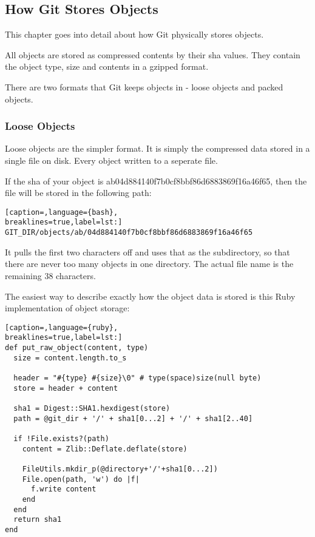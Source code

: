 \subsection{How Git Stores Objects}
This chapter goes into detail about how Git physically stores objects.

All objects are stored as compressed contents by their sha values. They contain
the object type, size and contents in a gzipped format.

There are two formats that Git keeps objects in - loose objects and packed
objects.

\subsubsection{Loose Objects}
Loose objects are the simpler format. It is simply the compressed data stored
in a single file on disk. Every object written to a seperate file.

If the sha of your object is ab04d884140f7b0cf8bbf86d6883869f16a46f65, then the
file will be stored in the following path:
\lstset{basicstyle=\scriptsize, numbers=none, captionpos=b, tabsize=4}
\begin{lstlisting}[caption=,language={bash},
breaklines=true,label=lst:]
GIT_DIR/objects/ab/04d884140f7b0cf8bbf86d6883869f16a46f65
\end{lstlisting}

It pulls the first two characters off and uses that as the subdirectory, so
that there are never too many objects in one directory. The actual file name is
the remaining 38 characters.

The easiest way to describe exactly how the object data is stored is this Ruby
implementation of object storage:
\lstset{basicstyle=\scriptsize, numbers=none, captionpos=b, tabsize=4}
\begin{lstlisting}[caption=,language={ruby},
breaklines=true,label=lst:]
def put_raw_object(content, type)
  size = content.length.to_s

  header = "#{type} #{size}\0" # type(space)size(null byte)
  store = header + content

  sha1 = Digest::SHA1.hexdigest(store)
  path = @git_dir + '/' + sha1[0...2] + '/' + sha1[2..40]

  if !File.exists?(path)
    content = Zlib::Deflate.deflate(store)

    FileUtils.mkdir_p(@directory+'/'+sha1[0...2])
    File.open(path, 'w') do |f|
      f.write content
    end
  end
  return sha1
end
\end{lstlisting}

